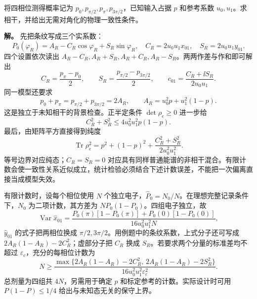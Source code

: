 \begin{exbox}[四相位数据的解析重建与正性检查]
将四相位测得概率记为 $p_0,p_{\pi/2},p_\pi,p_{3\pi/2}$，已知输入占据 $p$ 和参考系数 $u_0,u_1$。求相干，并给出无需对角化的物理一致性条件。

\textbf{解。}
先把条纹写成三个实系数：
\begin{equation*}
 P_0(\varphi_R)=A_R-C_R\cos\varphi_R+S_R\sin\varphi_R,
 \quad C_R=2u_0u_1x_{01},\quad S_R=2u_0u_1y_{01}.
\end{equation*}
四个设置依次读出 $A_R-C_R,A_R+S_R,A_R+C_R,A_R-S_R$。两两作差与作和即可解出
\begin{equation*}
 C_R=\frac{p_\pi-p_0}{2},\qquad
 S_R=\frac{p_{\pi/2}-p_{3\pi/2}}2,\qquad
 c_{01}=\frac{C_R+\ii S_R}{2u_0u_1}.
\end{equation*}
同一模型还要求
\begin{equation*}
 p_0+p_\pi=p_{\pi/2}+p_{3\pi/2}=2A_R,
 \qquad A_R=u_0^2p+u_1^2(1-p).
\end{equation*}
这是独立于未知相干的背景检查。正半定条件 $\det\rho_e\ge0$ 进一步给
\begin{equation*}
 C_R^2+S_R^2\le4u_0^2u_1^2p(1-p).
\end{equation*}
最后，由矩阵平方直接得到纯度
\begin{equation*}
 \operatorname{Tr}\rho_e^2=p^2+(1-p)^2
 +\frac{C_R^2+S_R^2}{2u_0^2u_1^2}.
\end{equation*}
等号边界对应纯态；$C_R=S_R=0$ 对应具有同样普通能谱的非相干混合。有限计数会使一致性关系近似成立，统计检验必须结合下述计数误差，不能把一次偏离直接当成模型失效。
\end{exbox}

有限计数时，设每个相位使用 $N$ 个独立电子，$\widehat P_0=N_0/N$。在理想完整记录条件下，$N_0$ 为二项计数，其方差为 $NP_0(1-P_0)$。四组电子独立，故
\begin{equation}
 \operatorname{Var}\widehat x_{01}
 =\frac{P_0(\pi)[1-P_0(\pi)]+P_0(0)[1-P_0(0)]}
 {16u_0^2u_1^2N},
 \label{eq:electron-reference-counting-uncertainty}
\end{equation}
$\widehat y_{01}$ 的式子把两相位换成 $\pi/2,3\pi/2$。用例题中的条纹系数，上式分子还可写成 $2A_R(1-A_R)-2C_R^2$；虚部分子把 $C_R$ 换成 $S_R$。若要求两个分量的标准差均不超过 $\varepsilon_c$，充分的每相位计数为
\begin{equation*}
 N\ge\frac{\max\{2A_R(1-A_R)-2C_R^2,\,
 2A_R(1-A_R)-2S_R^2\}}{16u_0^2u_1^2\varepsilon_c^2}.
\end{equation*}
总剂量为四组共 $4N$，另需用于确定 $p$ 和标定参考的计数。实际设计时可用 $P(1-P)\le1/4$ 给出与未知态无关的保守上界。

